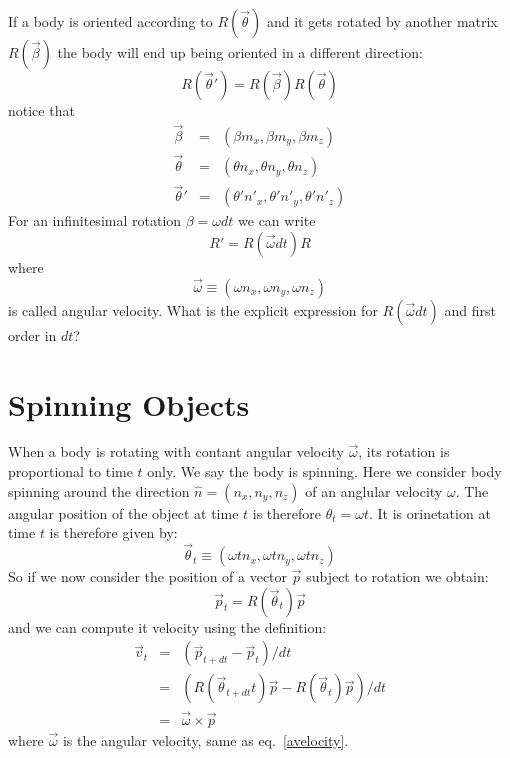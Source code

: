 \documentclass[12pt]{article}
\begin{document}
If a body is oriented according to $R(\vec \theta)$ and it gets rotated by another matrix $R(\vec \beta)$ the body will end up being oriented in a different direction:
\begin{equation}
R(\vec \theta') = R(\vec \beta) R(\vec \theta)
\end{equation}
notice that
\begin{eqnarray}
\vec \beta &=& (\beta m_x, \beta m_y, \beta m_z) \\
\vec \theta &=& (\theta n_x, \theta n_y, \theta n_z) \\
\vec \theta' &=& (\theta' n'_x, \theta' n'_y, \theta' n'_z)
\end{eqnarray}
For an infinitesimal rotation $\beta = \omega dt$ we can write
\begin{equation}
R' = R(\vec \omega dt) R
\end{equation}
where
\begin{equation}
\vec \omega \equiv (\omega n_x, \omega n_y, \omega n_z)
\label{avelocity}
\end{equation}
is called angular velocity. What is the explicit expression for $R(\vec \omega dt)$ and first order in $dt$?

\section{Spinning Objects}

When a body is rotating with contant angular velocity $\vec \omega$, its rotation is proportional to time $t$ only. We say the body is spinning. Here we consider body spinning around the direction $\hat n=(n_x,n_y,n_z)$ of an anglular velocity $\omega$. The angular position of the object at time $t$ is therefore $\theta_t = \omega t$.
It is orinetation at time $t$ is therefore given by:
\begin{equation}
\vec \theta_t \equiv (\omega t n_x, \omega t n_y, \omega t n_z)
\end{equation}
So if we now consider the position of a vector $\vec p$ subject to rotation we obtain:
\begin{equation}
\vec p_t = R(\vec \theta_t) \vec p
\label{rottheta}
\end{equation}
and we can compute it velocity using the definition:
\begin{eqnarray}
\vec v_t &=& (\vec p_{t+dt} - \vec p_t)/dt \\
         &=& (R(\vec \theta_{t+dt}t) \vec p - R(\vec \theta_t) \vec p)/dt \\
         &=& \vec \omega \times \vec p
\label{vomega}
\end{eqnarray}
where $\vec \omega$ is the angular velocity, same as eq.~\ref{avelocity}.
\end{document}

